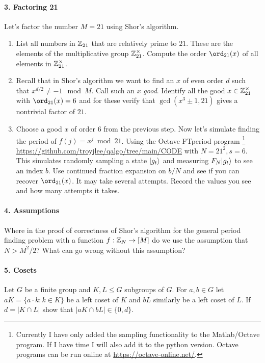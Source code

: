 \paragraph*{3. Factoring 21}
Let's factor the number $M=21$ using Shor's algorithm.
\begin{enumerate}
  \item List all numbers in $\mathbb{Z}_{21}$ that are relatively prime to $21$.  These are the elements of the multiplicative group $\mathbb{Z}_{21}^\times$.  Compute 
  the order $\ord_{21}(x)$ of all elements in $\mathbb{Z}_{21}^\times$.
  \item Recall that in Shor's algorithm we want to find an $x$ of even order $d$ such that $x^{d/2} \ne -1 \mod M$.  Call such an $x$ \emph{good}. 
  Identify all the good $x \in \mathbb{Z}_{21}^\times$ with $\ord_{21}(x) = 6$ and for these verify that $\gcd(x^3 \pm 1, 21)$ gives a nontrivial factor of $21$.
  \item Choose a good $x$ of order $6$ from the previous step.  Now let's simulate finding the period of $f(j) = x^j \bmod{21}$.  Using the Octave FTperiod program 
  \footnote{Currently I have only added the sampling functionality to the Matlab/Octave program.  If I have time I will also add it to the python version.  
  Octave programs can be run online at \url{https://octave-online.net/}.}
  \url{https://github.com/troyjlee/qalgo/tree/main/CODE} with $N = 21^2, s=6$.  This simulates randomly sampling a state $|g_t\rangle$ and 
  measuring $F_N |g_t\rangle$ to see an index $b$.  Use continued fraction expansion on $b/N$ and see if you can recover $\ord_{21}(x)$.  
  It may take several attempts.  Record the values you see and how many attempts it takes.
\end{enumerate}

\paragraph*{4. Assumptions} 
Where in the proof of correctness of Shor's algorithm for the general period finding problem with a function 
$f: \mathbb{Z}_N \rightarrow [M]$ do we use the assumption that $N > M^2/2$?  What can go wrong without this assumption?

\paragraph*{5. Cosets}
Let $G$ be a finite group and $K, L \le G$ subgroups of $G$.  For $a,b \in G$ let $aK = \{a \cdot k : k \in K\}$ 
be a left coset of $K$ and $bL$ similarly be a left coset of $L$.  If $d = |K \cap L|$ show that $|aK \cap bL| \in \{0,d\}$.  

